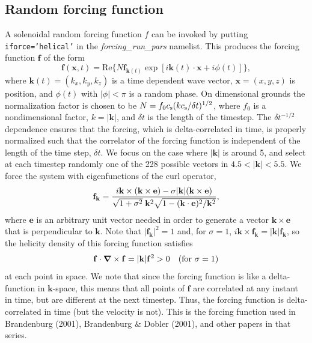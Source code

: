 \documentclass[\mydriver,12pt,twoside,notitlepage,a4paper]{article}
\makeatletter
\newcommand{\code}[1]{\texttt{#1}}
\newcommand{\name}[2][]{%
  \def\index@{#1}%
  \textsl{#2\/}%
  \ifx\index@\@empty\index{#2@\MakeUppercase #2}%
  \else\index{#1}%
  \fi%
}
\newcommand{\vekt}[1] {\mathbf{#1}}
\newcommand{\ev}            {\vekt{e}}
\newcommand{\fv}            {\vekt{f}}
\newcommand{\kv}            {\vekt{k}}
\newcommand{\xv}            {\vekt{x}}
\newcommand{\nab}{\mbox{\boldmath $\nabla$} {}}
\makeatother
\begin{document}

\subsection{Random forcing function}
\label{SRandomForcingFunction}

A solenoidal random forcing function $f$ can be invoked by putting
\code{iforce='helical'} in the \name{forcing_run_pars} namelist.
This produces the forcing function $\fv$ of the form
\begin{equation}
\fv(\xv,t)=\mbox{Re}\{N\fv_{\kv(t)}\exp[i\kv(t)\cdot\xv+i\phi(t)]\},
\end{equation}
where $\kv(t)=(k_x,k_y,k_z)$ is a time dependent wave vector,
$\xv=(x,y,z)$ is position, and $\phi(t)$ with $|\phi|<\pi$ is
a random phase. On dimensional grounds the normalization factor
is chosen to be
$N=f_0 c_{\rm s}(kc_{\rm s}/\delta t)^{1/2}$, where $f_0$ is a
nondimensional factor, $k=|\kv|$, and $\delta t$ is the length of
the timestep.
The $\delta t^{-1/2}$ dependence ensures that the forcing,
which is delta-correlated in time, is properly normalized such
that the correlator of the forcing function is independent of the
length of the time step, $\delta t$.
We focus on the case where $|\kv|$ is around 5, and
select at each timestep randomly one of the 228 possible vectors in
$4.5<|\kv|<5.5$. We force the system with eigenfunctions of the curl
operator,
\begin{equation}
\fv_{\kv}={i\kv\times(\kv\times\ev)-\sigma|\kv|(\kv\times\ev)
\over\sqrt{1+\sigma^2}\;\kv^2\sqrt{1-(\kv\cdot\ev)^2/\kv^2}},
\end{equation}
where $\ev$ is an arbitrary unit vector needed in order
to generate a vector $\kv\times\ev$ that is perpendicular
to $\kv$. Note that $|\fv_{\kv}|^2=1$ and, for $\sigma=1$,
$i\kv\times\fv_{\kv}=|\kv|\fv_{\kv}$, so the helicity density of this
forcing function satisfies
\begin{equation}
\fv\cdot\nab\times\fv=|\kv|\fv^2>0\quad(\mbox{for $\sigma=1$})
\end{equation}
at each point in space. We note that since the forcing function is like
a delta-function in $\kv$-space, this means that all points of $\fv$
are correlated at any instant in time, but are different at the next
timestep. Thus, the forcing function is delta-correlated in time (but
the velocity is not). This is the forcing function used in Brandenburg
(2001), Brandenburg \& Dobler (2001), and other papers in that series.
\end{document}
